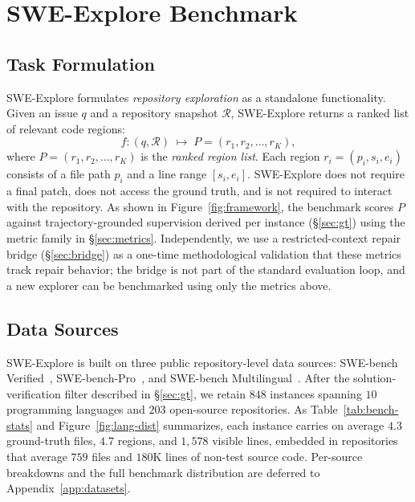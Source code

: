 \documentclass{llmxive}
\begin{document}
\FloatBarrier

\section{SWE-Explore Benchmark}



\subsection{Task Formulation}
SWE-Explore formulates \emph{repository exploration} as a standalone functionality. Given an issue $q$ and a repository snapshot $\mathcal{R}$, SWE-Explore returns a ranked list of relevant code regions: 
\[
  f : (q, \mathcal{R}) \;\mapsto\; P = (r_1, r_2, \ldots, r_K),
\]
where \(P= (r_1, r_2, \ldots, r_K)\) is the \emph{ranked region list}. Each region $r_i = (p_i, s_i, e_i)$ consists of a file path $p_i$ and a line range $[s_i, e_i]$. SWE-Explore does not require a final patch, does not access the ground truth, and is not required to interact with the repository. As shown in Figure~\ref{fig:framework}, the benchmark scores $P$ against trajectory-grounded supervision derived per instance (\S\ref{sec:gt}) using the metric family in \S\ref{sec:metrics}. Independently, we use a restricted-context repair bridge (\S\ref{sec:bridge}) as a one-time methodological validation that these metrics track repair behavior; the bridge is not part of the standard evaluation loop, and a new explorer can be benchmarked using only the metrics above.




\subsection{Data Sources}
\label{sec:stats}
SWE-Explore is built on three public repository-level data sources: SWE-bench Verified~\citep{jimenez2024swebench,chowdhury2024swebenchverified}, SWE-bench-Pro~\citep{deng2025swebenchproaiagents}, and SWE-bench Multilingual~\citep{yang2025swesmith}. After the solution-verification filter described in \S\ref{sec:gt}, we retain $848$ instances spanning $10$ programming languages and $203$ open-source repositories. As Table~\ref{tab:bench-stats} and Figure~\ref{fig:lang-dist} summarizes, each instance carries on average $4.3$ ground-truth files, $4.7$ regions, and $1{,}578$ visible lines, embedded in repositories that average $759$ files and $180$K lines of non-test source code. Per-source breakdowns and the full benchmark distribution are deferred to Appendix~\ref{app:datasets}.
\end{document}
